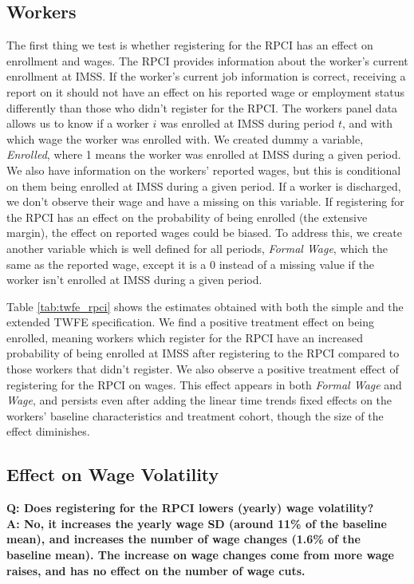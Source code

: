 \documentclass[oneside,11pt]{article}
\begin{document}
\subsection{Workers} \label{subsec:workers}

The first thing we test is whether registering for the RPCI has an effect on enrollment and wages. The RPCI provides information about the worker's current enrollment at IMSS. If the worker's current job information is correct, receiving a report on it should not have an effect on his reported wage or employment status differently than those who didn't register for the RPCI. The workers panel data allows us to know if a worker $i$ was enrolled at IMSS during period $t$, and with which wage the worker was enrolled with. We created dummy a variable, \textit{Enrolled}, where 1 means the worker was enrolled at IMSS during a given period. We also have information on the workers' reported wages, but this is conditional on them being enrolled at IMSS during a given period. If a worker is discharged, we don't observe their wage and have a missing on this variable. If registering for the RPCI has an effect on the probability of being enrolled (the extensive margin), the effect on reported wages could be biased. To address this, we create another variable which is well defined for all periods, \textit{Formal Wage}, which the same as the reported wage, except it is a 0 instead of a missing value if the worker isn't enrolled at IMSS during a given period. 

Table \ref{tab:twfe_rpci} shows the estimates obtained with both the simple and the extended TWFE specification. We find a positive treatment effect on being enrolled, meaning workers which register for the RPCI have an increased probability of being enrolled at IMSS after registering to the RPCI compared to those workers that didn't register. We also observe a positive treatment effect of registering for the RPCI on wages. This effect appears in both \textit{Formal Wage} and \textit{Wage}, and persists even after adding the linear time trends fixed effects on the workers' baseline characteristics and treatment cohort, though the size of the effect diminishes. 

\clearpage

\subsection{Effect on Wage Volatility}

\textbf{Q: Does registering for the RPCI lowers (yearly) wage volatility?}
\\
\textbf{A: No, it increases the yearly wage SD (around 11\% of the baseline mean), and increases the number of wage changes (1.6\% of the baseline mean). The increase on wage changes come from more wage raises, and has no effect on the number of wage cuts.}
\end{document}
